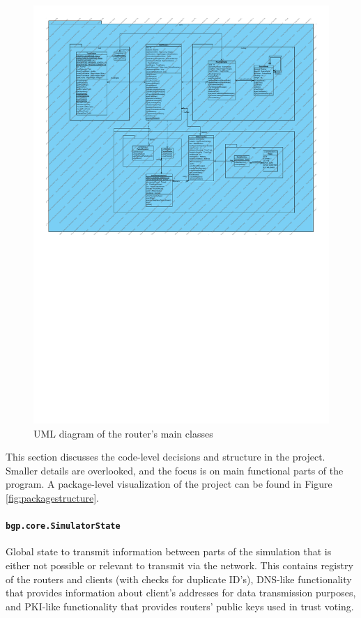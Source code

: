 \documentclass[11pt,a4paper,titlepage]{report}
\begin{document}
\begin{figure}
\includegraphics[width=\textwidth]{uml_1}
\caption{UML diagram of the router's main classes}
\label{fig:uml}
\end{figure}

This section discusses the code-level decisions and structure in the project. Smaller details are overlooked, and the focus is on main functional parts of the program. A package-level visualization of the project can be found in Figure \ref{fig:packagestructure}.

\paragraph{\texttt{bgp.core.SimulatorState}}
Global state to transmit information between parts of the simulation that is either not possible or relevant to transmit via the network. This contains registry of the routers and clients (with checks for duplicate ID's), DNS-like functionality that provides information about client's addresses for data transmission purposes, and PKI-like functionality that provides routers' public keys used in trust voting.
\end{document}
